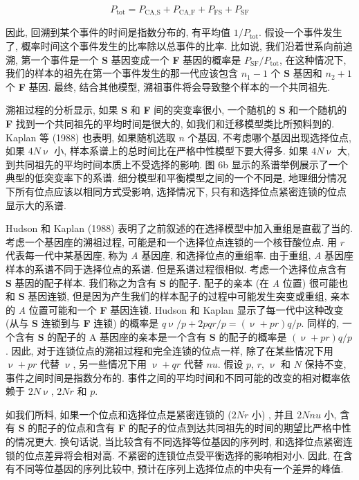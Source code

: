 \documentclass[12pt]{article}
\begin{document}
\begin{equation*}
    P_{\text{tot}} = P_{\text{CA},\text{S}} + P_{\text{CA},\text{F}} + P_{\text{FS}} + P_{\text{SF}}
\end{equation*}

因此, 回溯到某个事件的时间是指数分布的, 有平均值 $1/P_{\text{tot}}$. 假设一个事件发生了,
概率时间这个事件发生的比率除以总事件的比率. 比如说, 我们沿着世系向前追溯,
第一个事件是一个 \textbf{S} 基因变成一个 \textbf{F} 基因的概率是 $P_{\text{SF}}/P_{\text{tot}}$,
在这种情况下, 我们的样本的祖先在第一个事件发生的那一代应该包含 $n_{1}-1$ 个 \textbf{S} 基因和 $n_{2}+1$
个 \textbf{F} 基因. 最终, 结合其他模型, 溯祖事件将会导致整个样本的一个共同祖先.

溯祖过程的分析显示, 如果 \textbf{S} 和 \textbf{F} 间的突变率很小,
一个随机的 \textbf{S} 和一个随机的 \textbf{F} 找到一个共同祖先的平均时间是很大的, 如我们和迁移模型类比所预料到的. Kaplan
等 (1988) 也表明, 如果随机选取 $n$ 个基因, 不考虑哪个基因出现选择位点, 如果 $4N\upnu$ 小,
样本系谱上的总时间比在严格中性模型下要大得多. 如果 $4N\upnu$ 大, 到共同祖先的平均时间本质上不受选择的影响. 图 6b
显示的系谱举例展示了一个典型的低突变率下的系谱. 细分模型和平衡模型之间的一个不同是,
地理细分情况下所有位点应该以相同方式受影响, 选择情况下, 只有和选择位点紧密连锁的位点显示大的系谱.

Hudson 和 Kaplan (1988) 表明了之前叙述的在选择模型中加入重组是直截了当的. 考虑一个基因座的溯祖过程,
可能是和一个选择位点连锁的一个核苷酸位点. 用 $r$ 代表每一代中某基因座, 称为 \textit{A} 基因座, 和选择位点的重组率.
由于重组, \textit{A} 基因座样本的系谱不同于选择位点的系谱. 但是系谱过程很相似.
考虑一个选择位点含有 \textbf{S} 基因的配子样本. 我们称之为含有 \textbf{S} 的配子. 配子的亲本 (在 \textit{A} 位置)
很可能也和 \textbf{S} 基因连锁, 但是因为产生我们的样本配子的过程中可能发生突变或重组,
亲本的 \textit{A} 位置可能和一个 \textbf{F} 基因连锁. Hudson 和 Kaplan 显示了每一代中这种改变
(从与 \textbf{S} 连锁到与 \textbf{F} 连锁) 的概率是 $q\upnu/p+2pqr/p=(\upnu+pr)q/p$. 同样的,
一个含有 \textbf{S} 的配子的 A 基因座的亲本是一个含有 \textbf{S} 的配子的概率是 $(\upnu+pr)q/p$. 因此,
对于连锁位点的溯祖过程和完全连锁的位点一样, 除了在某些情况下用 $\upnu+pr$ 代替 $\upnu$, 另一些情况下用 $\upnu+qr$ 代替 $nu
$. 假设 $p$, $r$, $\upnu$ 和 $N$ 保持不变, 事件之间时间是指数分布的. 事件之间的平均时间和不同可能的改变的相对概率依赖于
$2N\upnu$, $2Nr$ 和 $p$.

如我们所料, 如果一个位点和选择位点是紧密连锁的 ($2Nr$ 小) , 并且 $2Nnu$ 小,
含有 \textbf{S} 的配子的位点和含有 \textbf{F} 的配子的位点到达共同祖先的时间的期望比严格中性的情况更大. 换句话说,
当比较含有不同选择等位基因的序列时, 和选择位点紧密连锁的位点差异将会相对高. 不紧密的连锁位点受平衡选择的影响相对小. 因此,
在含有不同等位基因的序列比较中, 预计在序列上选择位点的中央有一个差异的峰值.
\end{document}

